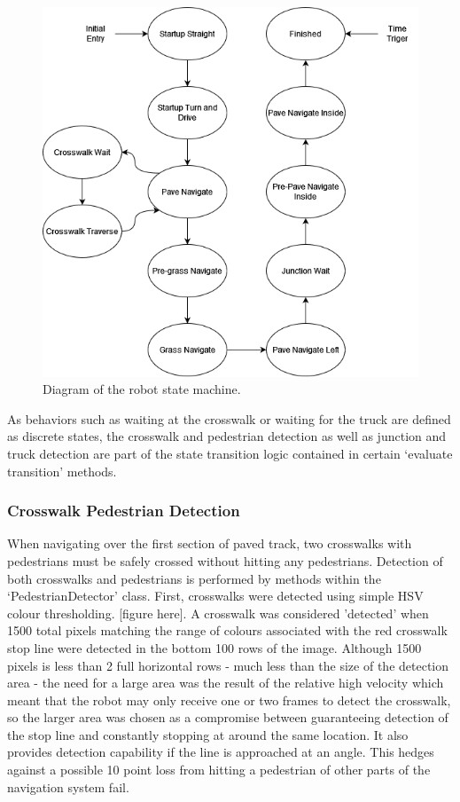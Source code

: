 \documentclass[titlepage, twocolumn]{article}
\begin{document}
        \begin{figure}
            \includegraphics[width=\linewidth]{statemachine.png}
            \caption{Diagram of the robot state machine.}
            \label{fig:statemachine}
        \end{figure}

        As behaviors such as waiting at the crosswalk or waiting for the truck are defined as discrete states, the crosswalk and pedestrian detection as well as junction and truck detection are part of the state transition logic contained in certain `evaluate transition' methods.

        \subsubsection{Crosswalk Pedestrian Detection}
            When navigating over the first section of paved track, two crosswalks with pedestrians must be safely crossed without hitting any pedestrians. Detection of both crosswalks and pedestrians is performed by methods within the `PedestrianDetector' class. First, crosswalks were detected using simple HSV colour thresholding. [figure here]. A crosswalk was considered 'detected' when 1500 total pixels matching the range of colours associated with the red crosswalk stop line were detected in the bottom 100 rows of the image. Although 1500 pixels is less than 2 full horizontal rows - much less than the size of the detection area - the need for a large area was the result of the relative high velocity which meant that the robot may only receive one or two frames to detect the crosswalk, so the larger area was chosen as a compromise between guaranteeing detection of the stop line and constantly stopping at around the same location. It also provides detection capability if the line is approached at an angle. This hedges against a possible 10 point loss from hitting a pedestrian of other parts of the navigation system fail.
\end{document}
